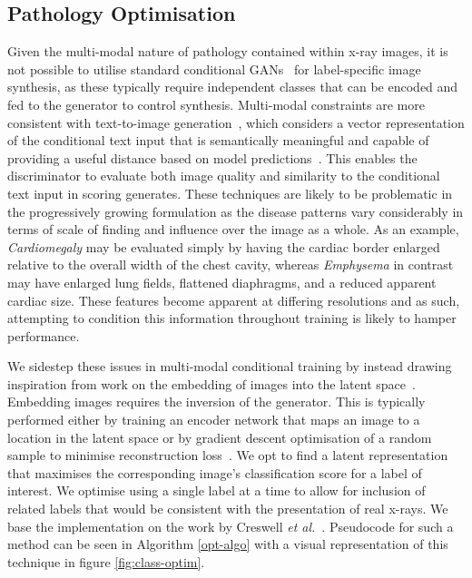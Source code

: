 \documentclass{article}
\begin{document}
\subsection{Pathology Optimisation}
\label{sec:image-optimiser}
Given the multi-modal nature of pathology contained within x-ray images, it is not possible to utilise standard conditional GANs~\cite{mirzaConditionalGenerativeAdversarial2014,odenaConditionalImageSynthesis2017a} for label-specific image synthesis, as these typically require independent classes that can be encoded and fed to the generator to control synthesis. Multi-modal constraints are more consistent with text-to-image generation~\cite{reedGenerativeAdversarialText}, which considers a vector representation of the conditional text input that is semantically meaningful and capable of providing a useful distance based on model predictions~\cite{mirzaConditionalGenerativeAdversarial2014}. This enables the discriminator to evaluate both image quality and similarity to the conditional text input in scoring generates. These techniques are likely to be problematic in the progressively growing formulation as the disease patterns vary considerably in terms of scale of finding and influence over the image as a whole. As an example, \emph{Cardiomegaly} may be evaluated simply by having the cardiac border enlarged relative to the overall width of the chest cavity, whereas \emph{Emphysema} in contrast may have enlarged lung fields, flattened diaphragms, and a reduced apparent cardiac size. These features become apparent at differing resolutions and as such, attempting to condition this information throughout training is likely to hamper performance. 

We sidestep these issues in multi-modal conditional training by instead drawing inspiration from work on the embedding of images into the latent space~\cite{creswellInvertingGeneratorGenerative2016}. Embedding images requires the inversion of the generator. This is typically performed either by training an encoder network that maps an image to a location in the latent space or by gradient descent optimisation of a random sample to minimise reconstruction loss~\cite{abdalImage2StyleGANHowEmbed2019}. We opt to find a latent representation that maximises the corresponding image's classification score for a label of interest. We optimise using a single label at a time to allow for inclusion of related labels that would be consistent with the presentation of real x-rays. We base the implementation on the work by Creswell \emph{et al.}~\cite{creswellInvertingGeneratorGenerative2016}. Pseudocode for such a method can be seen in Algorithm \ref{opt-algo} with a visual representation of this technique in figure \ref{fig:class-optim}. 
\end{document}
